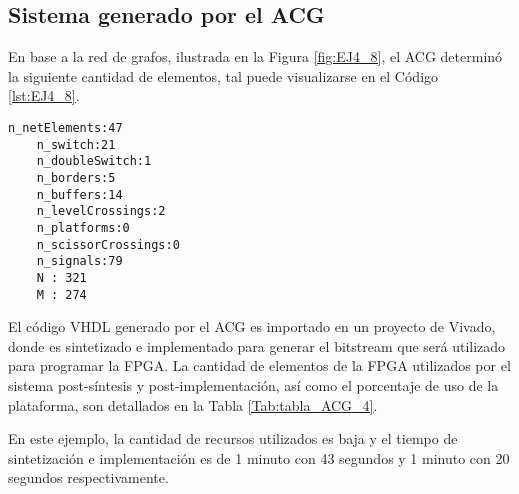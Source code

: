 \subsection{Sistema generado por el ACG}
	
	En base a la red de grafos, ilustrada en la Figura \ref{fig:EJ4_8}, el ACG determinó la siguiente cantidad de elementos, tal puede visualizarse en el Código \ref{lst:EJ4_8}.

	\begin{lstlisting}[language = {}, caption = Cantidad de elementos a implementar por el ACG, label = {lst:EJ4_8}]
	n_netElements:47
	n_switch:21
	n_doubleSwitch:1
	n_borders:5
	n_buffers:14
	n_levelCrossings:2
	n_platforms:0
	n_scissorCrossings:0
	n_signals:79
	N : 321
	M : 274
	\end{lstlisting}

	El código VHDL generado por el ACG es importado en un proyecto de Vivado, donde es sintetizado e implementado para generar el bitstream que será utilizado para programar la FPGA. La cantidad de elementos de la FPGA utilizados por el sistema post-síntesis y post-implementación, así como el porcentaje de uso de la plataforma, son detallados en la Tabla \ref{Tab:tabla_ACG_4}.
	
	\begin{table}[H]
		{
			\caption{Síntesis e implementación del ejemplo 4 generado por el ACG.}
			\label{Tab:tabla_ACG_4}
			\centering
			\begin{center}
			\end{center}
		}    
	\end{table}
	
	En este ejemplo, la cantidad de recursos utilizados es baja y el tiempo de sintetización e implementación es de 1 minuto con 43 segundos y 1 minuto con 20 segundos respectivamente.